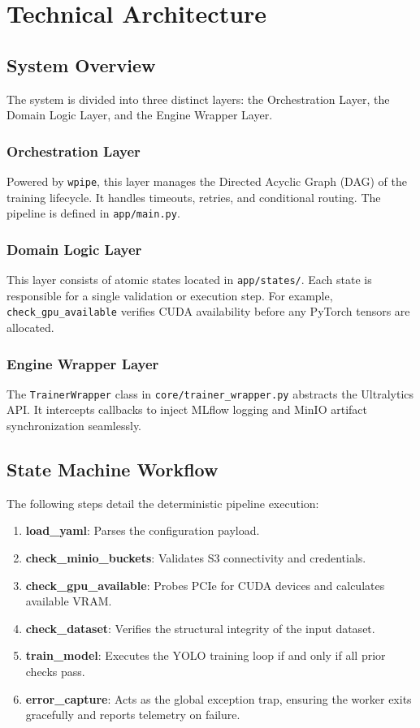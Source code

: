 \documentclass[12pt,a4paper]{report}
\begin{document}
\chapter{Technical Architecture}
\cleardoublepage
\section{System Overview}
The system is divided into three distinct layers: the Orchestration Layer, the Domain Logic Layer, and the Engine Wrapper Layer.

\subsection{Orchestration Layer}
Powered by \texttt{wpipe}, this layer manages the Directed Acyclic Graph (DAG) of the training lifecycle. It handles timeouts, retries, and conditional routing. The pipeline is defined in \texttt{app/main.py}.

\subsection{Domain Logic Layer}
This layer consists of atomic states located in \texttt{app/states/}. Each state is responsible for a single validation or execution step. For example, \texttt{check\_gpu\_available} verifies CUDA availability before any PyTorch tensors are allocated.

\subsection{Engine Wrapper Layer}
The \texttt{TrainerWrapper} class in \texttt{core/trainer\_wrapper.py} abstracts the Ultralytics API. It intercepts callbacks to inject MLflow logging and MinIO artifact synchronization seamlessly.

\section{State Machine Workflow}
The following steps detail the deterministic pipeline execution:
\begin{enumerate}
    \item \textbf{load\_yaml}: Parses the configuration payload.
    \item \textbf{check\_minio\_buckets}: Validates S3 connectivity and credentials.
    \item \textbf{check\_gpu\_available}: Probes PCIe for CUDA devices and calculates available VRAM.
    \item \textbf{check\_dataset}: Verifies the structural integrity of the input dataset.
    \item \textbf{train\_model}: Executes the YOLO training loop if and only if all prior checks pass.
    \item \textbf{error\_capture}: Acts as the global exception trap, ensuring the worker exits gracefully and reports telemetry on failure.
\end{enumerate}
\end{document}
